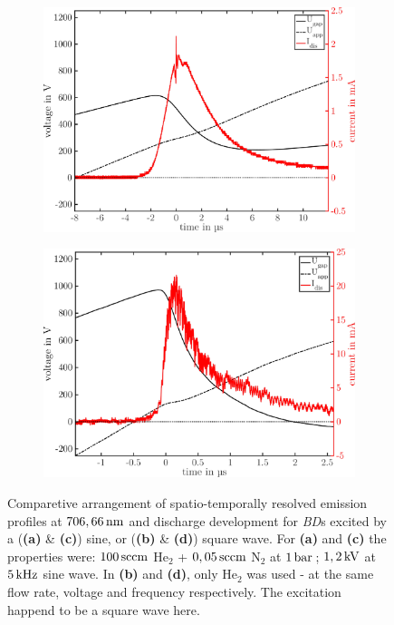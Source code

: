 \documentclass[a4paper,10pt]{article}
\newcommand{\tilt}[1]{\textit{#1}}
\newcommand{\fett}[1]{\textbf{#1}}
\begin{document}
\begin{figure}
\begin{subfigure}[t]{0.49\textwidth}
							\includegraphics[width=\textwidth]{figures/706nm@sine/current_dis.pdf}
							\caption{}
							\label{img:emissionsquare}
						\end{subfigure}
						\hfill
						\begin{subfigure}[t]{0.49\textwidth}
							\includegraphics[width=\textwidth]{figures/706nm@square/current_dis.pdf}
							\caption{}
							\label{img:currentsquare}
						\end{subfigure}
						\caption{Comparetive arrangement of spatio-temporally resolved emission profiles at $\unit[706,66]{nm}$ and discharge development for \tilt{BD}s excited by a (\fett{(a)} \& \fett{(c)}) sine, or (\fett{(b)} \& \fett{(d)}) square wave. For \fett{(a)} and \fett{(c)} the properties were: $\unit[100]{sccm}$ He$_2$ + $\unit[0,05]{sccm}$ N$_2$ at $\unit[1]{bar}$\,; $\unit[1,2]{kV}$ at $\unit[5]{kHz}$ sine wave. In \fett{(b)} and \fett{(d)}, only He$_2$ was used - at the same flow rate, voltage and frequency respectively. The excitation happend to be a square wave here.}
						\label{img:comparisonsinesquare}
					\end{figure}
				
\end{document}
